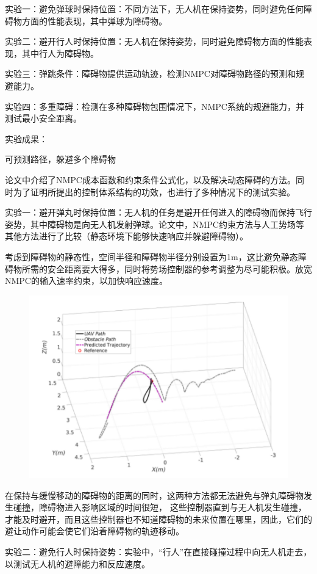\documentclass{article}
\begin{document}
实验一：避免弹球时保持位置：不同方法下，无人机在保持姿势，同时避免任何障碍物方面的性能表现，其中弹球为障碍物。\par
实验二：避开行人时保持位置：无人机在保持姿势，同时避免障碍物方面的性能表现，其中行人为障碍物。\par
实验三：弹跳条件：障碍物提供运动轨迹，检测NMPC对障碍物路径的预测和规避能力。\par
实验四：多重障碍：检测在多种障碍物包围情况下，NMPC系统的规避能力，并测试最小安全距离。\par
实验成果：\par
可预测路径，躲避多个障碍物\par
论文中介绍了NMPC成本函数和约束条件公式化，以及解决动态障碍的方法。同时为了证明所提出的控制体系结构的功效，也进行了多种情况下的测试实验。\par
实验一：避开弹丸时保持位置：无人机的任务是避开任何进入的障碍物而保持飞行姿势，其中障碍物是向无人机发射弹球。论文中，NMPC约束方法与人工势场等其他方法进行了比较（静态环境下能够快速响应并躲避障碍物）。\par
考虑到障碍物的静态性，空间半径和障碍物半径分别设置为1m，这比避免静态障碍物所需的安全距离要大得多，同时将势场控制器的参考调整为尽可能积极。放宽NMPC的输入速率约束，以加快响应速度。\par

\par
\begin{figure}[h!]
\centering
\includegraphics[scale=0.5]{4}
\label{fig:4}
\end{figure}


在保持与缓慢移动的障碍物的距离的同时，这两种方法都无法避免与弹丸障碍物发生碰撞，障碍物进入影响区域的时间很短， 这些控制器直到与无人机发生碰撞，才能及时避开，而且这些控制器也不知道障碍物的未来位置在哪里，因此，它们的避让动作可能会使它们沿着障碍物的轨迹移动。\par
实验二：避免行人时保持姿势：实验中，“行人”在直接碰撞过程中向无人机走去，以测试无人机的避障能力和反应速度。\par
\end{document}
